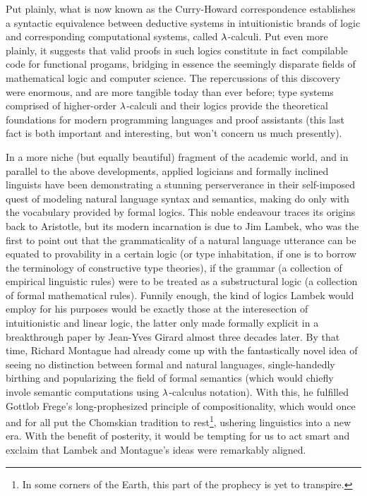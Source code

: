 Put plainly, what is now known as the Curry-Howard correspondence establishes a syntactic equivalence between deductive systems in intuitionistic brands of logic and corresponding computational systems, called $\mathnormal{\lambda}$-calculi.
Put even more plainly, it suggests that valid proofs in such logics constitute in fact compilable code for functional progams, bridging in essence the seemingly disparate fields of mathematical logic and computer science.
The repercussions of this discovery were enormous, and are more tangible today than ever before; type systems comprised of higher-order $\mathnormal{\lambda}$-calculi and their logics provide the theoretical foundations for modern programming languages and proof assistants (this last fact is both important and interesting, but won't concern us much presently).

In a more niche (but equally beautiful) fragment of the academic world, and in parallel to the above developments, applied logicians and formally inclined linguists have been demonstrating a stunning perserverance in their self-imposed quest of modeling natural language syntax and semantics, making do only with the vocabulary provided by formal logics.
This noble endeavour traces its origins back to Aristotle, but its modern incarnation is due to Jim Lambek, who was the first to point out that the grammaticality of a natural language utterance can be equated to provability in a certain logic (or type inhabitation, if one is to borrow the terminology of constructive type theories), if the grammar (a collection of empirical linguistic rules) were to be treated as a substructural logic (a collection of formal mathematical rules).
Funnily enough, the kind of logics Lambek would employ for his purposes would be exactly those at the interesection of intuitionistic and linear logic, the latter only made formally explicit in a breakthrough paper by Jean-Yves Girard almost three decades later.
By that time, Richard Montague had already come up with the fantastically novel idea of seeing no distinction between formal and natural languages, single-handedly birthing and popularizing the field of formal semantics (which would chiefly invole semantic computations using $\mathnormal{\lambda}$-calculus notation).
With this, he fulfilled Gottlob Frege's long-prophesized principle of compositionality, which would once and for all put the Chomskian tradition to rest\footnote{In some corners of the Earth, this part of the prophecy is yet to transpire.}, ushering linguistics into a new era.
With the benefit of posterity, it would be tempting for us to act smart and exclaim that Lambek and Montague's ideas were remarkably aligned. 
